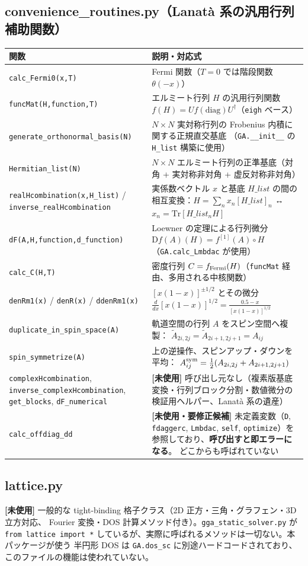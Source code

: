 \documentclass[11pt]{ltjsarticle}
\newcommand{\code}[1]{\texttt{#1}}
\begin{document}
\subsection*{convenience\_routines.py（Lanatà 系の汎用行列補助関数）}

\begin{longtable}{p{}p{}}
\toprule
関数 & 説明・対応式 \\
\midrule
\code{calc\_Fermi0(x,T)} & Fermi 関数（$T=0$ では階段関数 $\theta(-x)$）\\
\code{funcMat(H,function,T)} & エルミート行列 $H$ の汎用行列関数 $f(H)=U f(\mathrm{diag})U^\dagger$（\code{eigh} ベース）\\
\code{generate\_orthonormal\_basis(N)} & $N\times N$ 実対称行列の Frobenius 内積に関する正規直交基底
（\code{GA.\_\_init\_\_} の \code{H\_list} 構築に使用）\\
\code{Hermitian\_list(N)} & $N\times N$ エルミート行列の正準基底（対角 + 実対称非対角 + 虚反対称非対角）\\
\code{realHcombination(x,H\_list)} / \code{inverse\_realHcombination} & 実係数ベクトル
$x$ と基底 $H\_list$ の間の相互変換：$H=\sum_n x_n[H\_list]_n$ ↔ $x_n=\mathrm{Tr}[H\_list_n H]$ \\
\code{dF(A,H,function,d\_function)} & Loewner の定理による行列微分
$\mathrm{D}f(A)(H)=f^{[1]}(A)\circ H$（\code{GA.calc\_Lmbdac} が使用）\\
\code{calc\_C(H,T)} & 密度行列 $C=f_{\rm Fermi}(H)$（\code{funcMat} 経由、多用される中核関数）\\
\code{denRm1(x)} / \code{denR(x)} / \code{ddenRm1(x)} & $[x(1-x)]^{\pm1/2}$ とその微分
$\frac{d}{dx}[x(1-x)]^{1/2}=\frac{0.5-x}{[x(1-x)]^{1/2}}$ \\
\code{duplicate\_in\_spin\_space(A)} & 軌道空間の行列 $A$ をスピン空間へ複製：
$\tilde A_{2i,2j}=\tilde A_{2i+1,2j+1}=A_{ij}$ \\
\code{spin\_symmetrize(A)} & 上の逆操作、スピンアップ・ダウンを平均：
$A^{\rm sym}_{ij}=\frac12(A_{2i,2j}+A_{2i+1,2j+1})$ \\
\midrule
\code{complexHcombination}, \code{inverse\_complexHcombination}, \code{get\_blocks},
\code{dF\_numerical} & \textbf{[未使用]} 呼び出し元なし（複素版基底変換・行列ブロック分割・数値微分の
検証用ヘルパー、Lanatà 系の遺産）\\
\code{calc\_offdiag\_dd} & \textbf{[未使用・要修正候補]} 未定義変数（\code{D}, \code{fdaggerc},
\code{Lmbdac}, \code{self}, \code{optimize}）を参照しており、\textbf{呼び出すと即エラーになる}。
どこからも呼ばれていない \\
\bottomrule
\end{longtable}

\subsection*{lattice.py}

\textbf{[未使用]} 一般的な tight-binding 格子クラス（2D 正方・三角・グラフェン・3D 立方対応、
Fourier 変換・DOS 計算メソッド付き）。\code{gga\_static\_solver.py} が
\code{from lattice import *} しているが、実際に呼ばれるメソッドは一切ない。本パッケージが使う
半円形 DOS は \code{GA.dos\_sc} に別途ハードコードされており、このファイルの機能は使われていない。
\end{document}
